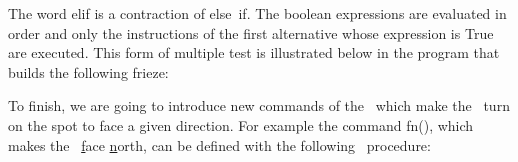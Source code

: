  The word {\mcl elif} is a contraction of {\mcl else}~{\mcl if}. The boolean
 expressions are evaluated in order and only the instructions of the first alternative
 whose expression is {\mcl True} are executed.
 This form of multiple test is illustrated below in the program that builds the following frieze:

  {\raggedright 
 
 }

To finish, we are going to introduce new commands of the \robot\ which
make the \robot\ turn on the spot to face a given direction. For example the command
{\idt fn()}, which makes the \robot\ \underline{f}ace \underline{n}orth, can
be defined with the following \python\ procedure:

{
\parindent {}
\medskip

\vspace{\neglskip}\mbox{}\par
\vspace{\neglskip}\mbox{}\par
\vspace{\neglskip}\mbox{\blc \blk{}}\par
\vspace{\neglskip}\mbox{\blc \blk\blk\blk{}}\par
\vspace{\neglskip}\mbox{\blc \blk{}}\par
\vspace{\neglskip}\mbox{\blc \blk\blk\blk{}}\par
\vspace{\neglskip}\mbox{\blc \blk{}}\par
\vspace{\neglskip}\mbox{\blc \blk\blk\blk{}}\par
\vspace{\neglskip}\mbox{\blc \blk{}}\par
\vspace{\neglskip}\mbox{\blc \blk\blk\blk{}}\par
\vspace{\neglskip}\mbox{\blc \blk{}}\par
\vspace{\neglskip}\mbox{\blc \blk\blk\blk{}}\par
\vspace{\neglskip}\mbox{\blc \blk{}}\par
\vspace{\neglskip}\mbox{\blc \blk\blk\blk{}}\par
\vspace{\neglskip}\mbox{\blc \blk{}}\par
\vspace{\neglskip}\mbox{\blc \blk\blk\blk{}}\par

\medskip }

